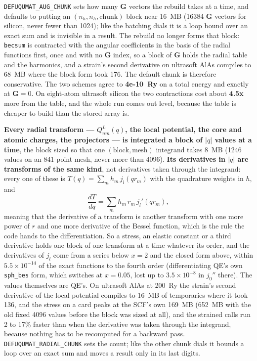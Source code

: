 \documentclass[11pt,a4paper]{article}
\newcommand{\code}[1]{\texttt{\small #1}}
\begin{document}
\code{DEFUQUMAT\_AUG\_CHUNK} sets how many $\mathbf G$ vectors the rebuild takes
at a time, and defaults to putting an $(n_h, n_h, \text{chunk})$ block near
16~MB (16384 $\mathbf G$ vectors for silicon, never fewer than 1024); like the
batching dials it is a loop bound over an exact sum and is invisible in a
result. The rebuild no longer forms that block: \code{becsum} is contracted
with the angular coefficients in the basis of the radial functions first, once
and with no $\mathbf G$ index, so a block of $\mathbf G$ holds the radial table
and the harmonics, and a strain's second derivative on ultrasoft AlAs compiles
to 68~MB where the block form took 176. The default chunk is therefore
conservative. The two schemes agree to \textbf{4e-10~Ry} on a total energy and
exactly at $\mathbf{G} = 0$. On eight-atom ultrasoft silicon the two
contractions cost about \textbf{4.5x} more from the table, and the whole run
comes out level, because the table is cheaper to build than the stored array
is.

\textbf{Every radial transform --- $Q^L_{nm}(q)$, the local potential, the core
and atomic charges, the projectors --- is integrated a block of $|q|$ values at a
time}, the block sized so that one $(\text{block}, \text{mesh})$ integrand
takes 8~MB (1246 values on an 841-point mesh, never more than 4096).
\textbf{Its derivatives in $|q|$ are transforms of the same kind}, not
derivatives taken through the integrand: every one of these is
$T(q) = \sum_m h_m\, j_l(q r_m)$ with the quadrature weights in $h$, and
\begin{equation*}
  \frac{dT}{dq} = \sum_m h_m\, r_m\, j_l'(q r_m),
\end{equation*}
meaning that the derivative of a transform is another transform with one more
power of $r$ and one more derivative of the Bessel function, which is the rule
the code hands to the differentiation. So a stress, an elastic constant or a
third derivative holds one block of one transform at a time whatever its
order, and the derivatives of $j_l$ come from a series below $x = 2$ and the
closed form above, within $5.5\times10^{-14}$ of the exact functions to the
fourth order (differentiating QE's own \code{sph\_bes} form, which switches at
$x = 0.05$, lost up to $3.5\times10^{-8}$ in $j_0''$ there). The values
themselves are QE's. On ultrasoft AlAs at 200~Ry the strain's second derivative
of the local potential compiles to 16~MB of temporaries where it took 136, and
the stress on a card peaks at the SCF's own 169~MB (652~MB with the old fixed
4096 values before the block was sized at all), and the strained calls run 2
to 17\% faster than when the derivative was taken through the integrand,
because nothing has to be recomputed for a backward pass. \code{DEFUQUMAT\_RADIAL\_CHUNK}
sets the count; like the other chunk dials it bounds a loop over an exact sum
and moves a result only in its last digits.
\end{document}
